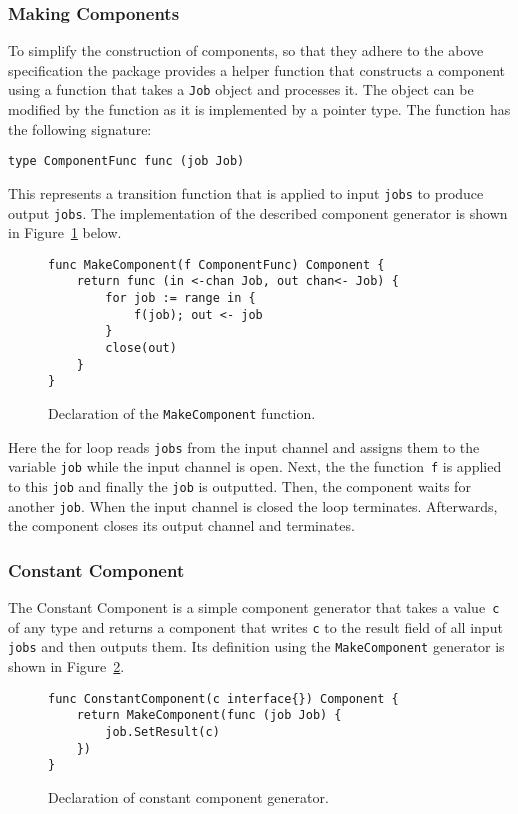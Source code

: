 \subsubsection{Making Components}
To simplify the construction of components, so that they adhere to 
the above specification the package provides a helper function that 
constructs a component using a function that takes a \texttt{Job} object 
and processes it. The object can be modified by the function as it is 
implemented by a pointer type. The function has the following signature:
\begin{lstlisting}
type ComponentFunc func (job Job)
\end{lstlisting}
This represents a transition function that is applied to input \texttt{jobs}
to produce output \texttt{jobs}.
The implementation of the described component generator is shown in 
Figure~\ref{fig:MakeComponent} below.
\begin{figure}[h]
\centering
\begin{lstlisting}
func MakeComponent(f ComponentFunc) Component {
    return func (in <-chan Job, out chan<- Job) {
        for job := range in {
            f(job); out <- job
        }
        close(out)
    }
}
\end{lstlisting}
\caption[scale=1.0]{Declaration of the \texttt{MakeComponent} function.}
\label{fig:MakeComponent}
\end{figure}

Here the for loop reads \texttt{jobs} from the input channel and assigns them
to the variable \texttt{job} while the input channel is open. Next, the 
the function~\texttt{f} is applied to this \texttt{job} and finally 
the \texttt{job} is outputted.
Then, the component waits for another \texttt{job}. When the input channel
is closed the loop terminates. Afterwards, the component closes its output channel
and terminates.

\subsubsection{Constant Component}
The Constant Component is a simple component generator that takes a value~\texttt{c}
of any type and returns a component that writes \texttt{c} to the result field of 
all input \texttt{jobs} and then outputs them. Its definition using the 
\texttt{MakeComponent} generator is shown in Figure~\ref{fig:ConstantComponent}.
\begin{figure}[h]
\centering
\begin{lstlisting}
func ConstantComponent(c interface{}) Component {
    return MakeComponent(func (job Job) {
        job.SetResult(c)
    })
}
\end{lstlisting}
\caption[scale=1.0]{Declaration of constant component generator.}
\label{fig:ConstantComponent}
\end{figure}

